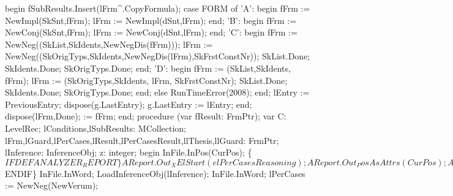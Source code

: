    begin
      fSubResults.Insert(lFrm^.CopyFormula);
      case FORM of
         'A': begin fFrm := NewImpl(SkSnt,fFrm); lFrm := NewImpl(dSnt,lFrm); end;
         'B': begin fFrm := NewConj(SkSnt,fFrm); lFrm := NewConj(dSnt,lFrm); end;
         'C':
            begin
               fFrm := NewNeg((SkList,SkIdents,NewNegDis(fFrm)));
               lFrm := NewNeg((SkOrigTyps,SkIdents,NewNegDis(lFrm),SkFrstConstNr));
               SkList.Done; SkIdents.Done; SkOrigTyps.Done;
            end;
         'D':
            begin
               fFrm := (SkList,SkIdents, fFrm);
               lFrm := (SkOrigTyps,SkIdents, lFrm, SkFrstConstNr);
               SkList.Done; SkIdents.Done; SkOrigTyps.Done;
            end;
      else RunTimeError(2008);
      end;
      lEntry := PreviousEntry;
      dispose(g.LastEntry);
      g.LastEntry := lEntry;
   end;
   dispose(lFrm,Done);
    := fFrm;
end;
\eatline
{}\nwendcode{}\nwdocspar
\nwenddocs{}\endmoddef\nwstartdeflinemarkup{}\nwenddeflinemarkup
procedure (var fResult: FrmPtr);
var
   C: LevelRec;
   lConditions,lSubResults: MCollection;
   lFrm,lGuard,lPerCases,lResult,lPerCasesResult,llThesis,llGuard: FrmPtr;
   lInference: InferenceObj;
   z: integer;
begin
   InFile.InPos(CurPos);
   \{$IFDEF ANALYZER_REPORT\}
   AReport.Out_XElStart(elPerCasesReasoning);
   AReport.Out_PosAsAttrs(CurPos);
   AReport.Out_XAttrEnd;
   \{$ENDIF\}
   InFile.InWord;
   LoadInferenceObj(lInference);
   InFile.InWord;
   lPerCases := NewNeg(NewVerum);
